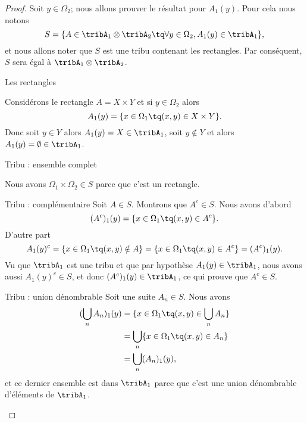 \begin{proof}
    Soit \( y\in\Omega_2\); nous allons prouver le résultat pour \( A_1(y)\). Pour cela nous notons
    \begin{equation}
        S=\{ A\in \tribA_1\otimes\tribA_2\tq \forall y\in\Omega_2, A_1(y)\in\tribA_1 \},
    \end{equation}
    et nous allons noter que \( S\) est une tribu contenant les rectangles. Par conséquent, \( S\) sera égal à \( \tribA_1\otimes \tribA_2\).

    \begin{subproof}
        \item[Les rectangles]

            Considérons le rectangle \( A=X\times Y\) et si \( y\in \Omega_2\) alors
            \begin{equation}
                A_1(y)=\{ x\in \Omega_1\tq (x,y)\in X\times Y \}.
            \end{equation}
            Donc soit \( y\in Y\) alors \( A_1(y)=X\in\tribA_1\), soit \( y\notin Y\) et alors \( A_1(y)=\emptyset\in\tribA_1\).

        \item[Tribu : ensemble complet]

            Nous avons \( \Omega_1\times \Omega_2\in S\) parce que c'est un rectangle.

        \item[Tribu : complémentaire] Soit \( A\in S\). Montrons que \( A^c\in S\). Nous avons d'abord
            \begin{equation}
                (A^c)_1(y)=\{ x\in \Omega_1\tq (x,y)\in A^c \}.
            \end{equation}
            D'autre part
            \begin{equation}
                A_1(y)^c=\{ x\in\Omega_1\tq (x,y)\notin A \}=\{ x\in \Omega_1\tq (x,y)\in A^c \}=(A^c)_1(y).
            \end{equation}
            Vu que \( \tribA_1\) est une tribu et que par hypothèse \( A_1(y)\in\tribA_1\), nous avons aussi \( A_1(y)^c\in S\), et donc \( (A^c)_1(y)\in \tribA_1\), ce qui prouve que \( A^c\in S\).

        \item[Tribu : union dénombrable] Soit une suite \( A_n\in S\). Nous avons
            \begin{subequations}
                \begin{align}
                (\bigcup_nA_n)_1(y)&=\{ x\in\Omega_1\tq (x,y)\in \bigcup_nA_n \}\\
                &=\bigcup_n\{ x\in\Omega_1\tq (x,y)\in A_n \}\\
                &=\bigcup_n(A_n)_1(y),
                \end{align}
            \end{subequations}
            et ce dernier ensemble est dans \( \tribA_1\) parce que c'est une union dénombrable d'éléments de \( \tribA_1\).


\end{subproof}
\end{proof}
